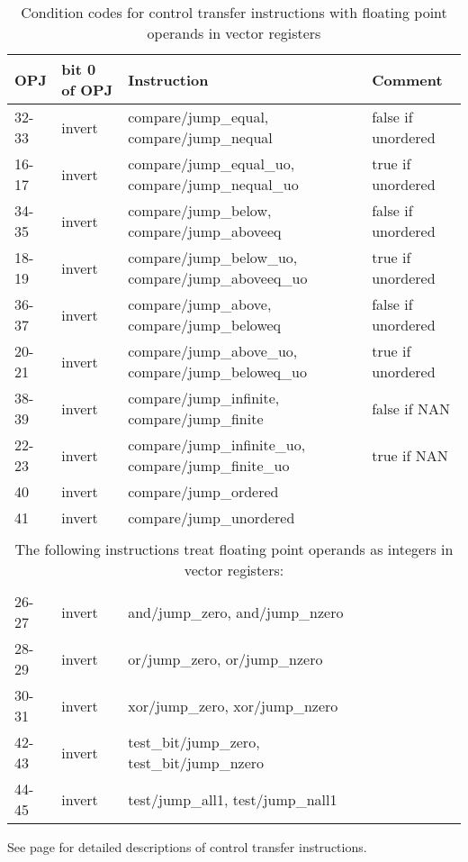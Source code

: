 \documentclass[forwardcom.tex]{subfiles}
\begin{document}
\begin{longtable}
{|p{10mm}|p{14mm}|p{55mm}|p{50mm}|}
\caption{Condition codes for control transfer instructions with floating point operands in vector registers }
\label{table:controlTransferInstructionsFloat}
\endfirsthead
\endhead
\hline
OPJ & bit 0 \newline of OPJ & Instruction & Comment \\
\hline
32-33 & invert & compare/jump\_equal, \newline compare/jump\_nequal & false if unordered \\
\hline
16-17 & invert & compare/jump\_equal\_uo, \newline compare/jump\_nequal\_uo & true if unordered \\
\hline
34-35 & invert & compare/jump\_below, \newline compare/jump\_aboveeq & false if unordered \\
\hline
18-19 & invert & compare/jump\_below\_uo, \newline compare/jump\_aboveeq\_uo & true if unordered \\
\hline
36-37 & invert & compare/jump\_above, \newline compare/jump\_beloweq & false if unordered \\
\hline
20-21 & invert & compare/jump\_above\_uo, \newline compare/jump\_beloweq\_uo & true if unordered \\
\hline
38-39 & invert & compare/jump\_infinite, \newline compare/jump\_finite & false if NAN  \\
\hline
22-23 & invert & compare/jump\_infinite\_uo, \newline compare/jump\_finite\_uo & true if NAN  \\
\hline
40    & invert & compare/jump\_ordered &  \\
\hline
41    & invert & compare/jump\_unordered &  \\
\hline

\multicolumn{4}{|c|}{} \\
\multicolumn{4}{|c|}{ The following instructions treat floating point operands as integers in vector registers: } \\
\multicolumn{4}{|c|}{} \\
\hline

26-27 & invert & and/jump\_zero, \newline and/jump\_nzero &  \\
\hline
28-29 & invert & or/jump\_zero, \newline or/jump\_nzero &  \\
\hline
30-31 & invert & xor/jump\_zero, \newline xor/jump\_nzero &  \\
\hline
42-43 & invert & test\_bit/jump\_zero, \newline test\_bit/jump\_nzero &  \\
\hline
44-45 & invert & test/jump\_all1, \newline test/jump\_nall1 &  \\
\hline

\end{longtable}


See page \pageref{descriptionOfControlTransferInstructions} for 
detailed descriptions of control transfer instructions.
\end{document}
